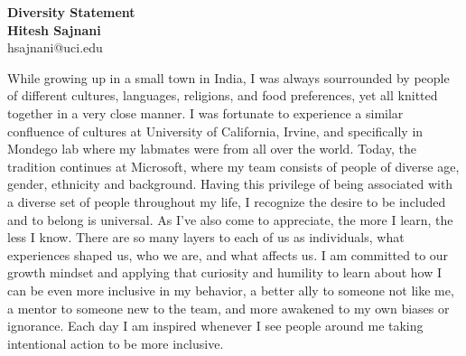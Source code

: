 \documentclass[a4paper, 12pt]{article}
\begin{document}

\begin{center}
{\LARGE \textbf{Diversity Statement}} \\[.3in]
{\large  \textbf{Hitesh Sajnani}} \\
{\small hsajnani@uci.edu}
\end{center}
\pagestyle{fancy}
\lhead{\textcolor{black}{\it Hitesh Sajnani}}
\rhead{\textcolor{black}{\thepage/\pageref{LastPage}}}






While growing up in a small town in India, I was always sourrounded by people of different cultures, languages, religions, and food preferences, yet all knitted together in a very close manner. I was fortunate to experience a similar confluence of cultures at University of California, Irvine, and specifically in Mondego lab where my labmates were from all over the world. Today, the tradition continues at Microsoft, where my team consists of people of diverse age, gender, ethnicity and background.  Having this privilege of being associated with a diverse set of people throughout my life, I recognize the desire to be included and to belong is universal. As I’ve also come to appreciate, the more I learn, the less I know. There are so many layers to each of us as individuals, what experiences shaped us, who we are, and what affects us.  I am committed to our growth mindset and applying that curiosity and humility to learn about how I can be even more inclusive in my behavior, a better ally to someone not like me, a mentor to someone new to the team, and more awakened to my own biases or ignorance. Each day I am inspired whenever I see people around me taking intentional action to be more inclusive. 
\end{document}
